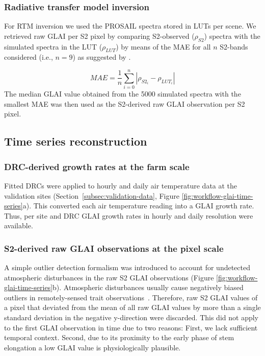 \subsubsection{Radiative transfer model inversion}
\label{subsubsec:rtm-inv}
For \gls{RTM} inversion we used the PROSAIL spectra stored in \gls{LUT}s per scene. We retrieved raw \gls{GLAI} per \gls{S2}  pixel by comparing \gls{S2}-observed ($\rho_{S2}$) spectra with the simulated spectra in the \gls{LUT} ($\rho_{LUT}$) by means of the \gls{MAE} for all $n$ \gls{S2}-bands considered (i.e., $n=9$) as suggested by \cite{graf_insights_2023}.

\begin{equation}
    MAE = \frac{1}{n} \sum_{i=0}^{n} |\rho_{{S2}_i} - \rho_{{LUT}_i} |
\end{equation}
The median \gls{GLAI} value obtained from the 5000 simulated spectra with the smallest \gls{MAE} was then used as the \gls{S2}-derived raw \gls{GLAI} observation per \gls{S2} pixel.


\subsection{Time series reconstruction}
\label{subsec:drc-model-inference}

\subsubsection{DRC-derived growth rates at the farm scale}

Fitted \gls{DRC}s were applied to hourly and daily air temperature data at the validation sites (Section~\ref{subsec:validation-data}, Figure \ref{fig:workflow-glai-time-series}a). This converted each air temperature reading into a \gls{GLAI} growth rate. Thus, per site and \gls{DRC} \gls{GLAI} growth rates in hourly and daily resolution were available.

\subsubsection{S2-derived raw GLAI observations at the pixel scale}
\label{subsubsec:s2-glai-simple-outlier-filter}
A simple outlier detection formalism was introduced to account for undetected atmospheric disturbances in the raw \gls{S2} \gls{GLAI} observations (Figure \ref{fig:workflow-glai-time-series}b). Atmospheric disturbances usually cause negatively biased outliers in remotely-sensed trait observations~\citep{chen_simple_2004}. Therefore, raw \gls{S2} \gls{GLAI} values of a pixel that deviated from the mean of all raw \gls{GLAI} values by more than a single standard deviation in the negative y-direction were discarded. This did not apply to the first \gls{GLAI} observation in time due to two reasons: First, we lack sufficient temporal context. Second, due to its proximity to the early phase of stem elongation a low \gls{GLAI} value is physiologically plausible.

